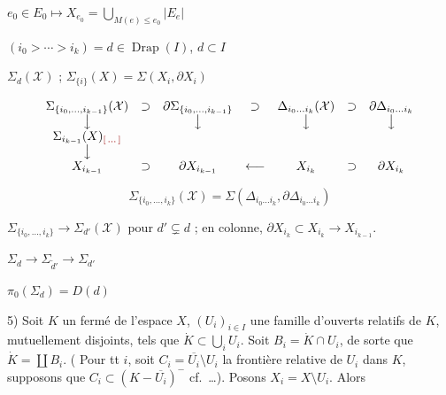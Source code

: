 \documentclass[11pt,a4paper]{article}
\begin{document}
$e_0 \in E_0 \mapsto X_{e_0} = \bigcup_{M(e) \leq e_0} |E_e|$

$(i_0 > \cdots > i_k) = d \in \operatorname{Drap}(I)$, $d \subset I$

$\Sigma_d(\mathcal{X})$ ;
$\Sigma_{\{i\}}(X) = \Sigma(X_i, \partial X_i)$

\[
\begin{array}{ccccccc}
\Sigma_{\{i_0, \dots, i_{k-1}\}}(\mathcal{X}) & \supset & \partial\Sigma_{\{i_0, \dots, i_{k-1}\}} & \supset & \Delta_{i_0 \dots i_k}(\mathcal{X}) & \supset & \partial\Delta_{i_0 \dots i_k} \\
\big\downarrow & & \big\downarrow & & \big\downarrow & & \big\downarrow \\
\Sigma_{i_{k-1}}(X)_{\ill{}} & & & & & & \\
\big\downarrow & & & & & & \\
X_{i_{k-1}} & \supset & \partial X_{i_{k-1}} & \longleftarrow & X_{i_k} & \supset & \partial X_{i_k}
\end{array}
\]

\[
\Sigma_{\{i_0, \dots, i_k\}}(\mathcal{X}) = \Sigma(\Delta_{i_0 \dots i_k}, \partial\Delta_{i_0 \dots i_k})
\]

$\Sigma_{\{i_0, \dots, i_k\}} \to \Sigma_{d'}(\mathcal{X})$ pour
$d' \subsetneq d$ ; en colonne,
$\partial X_{i_k} \subset X_{i_k} \to X_{i_{k-1}}$.

$\Sigma_d \to \Sigma_{\tilde{d}'} \to \Sigma_{d'}$



$\pi_0(\Sigma_d) = D(d)$

5) Soit $K$ un fermé de l'espace $X$, $(U_i)_{i \in I}$ une famille
d'ouverts relatifs de $K$, mutuellement disjoints, tels que
$\dot{K} \subset \bigcup_i U_i$. Soit $B_i = \dot{K} \cap U_i$, de
sorte que $\dot{K} = \coprod B_i$. ( Pour tt $i$, soit
$C_i = \overline{U_i} \setminus U_i$ la frontière relative de $U_i$ dans
$K$, supposons que $C_i \subset (K - \overline{U_i})^{-}$ cf.\ …). Posons
\struck{\ill{}} $X_i = X \setminus U_i$. Alors
\end{document}
